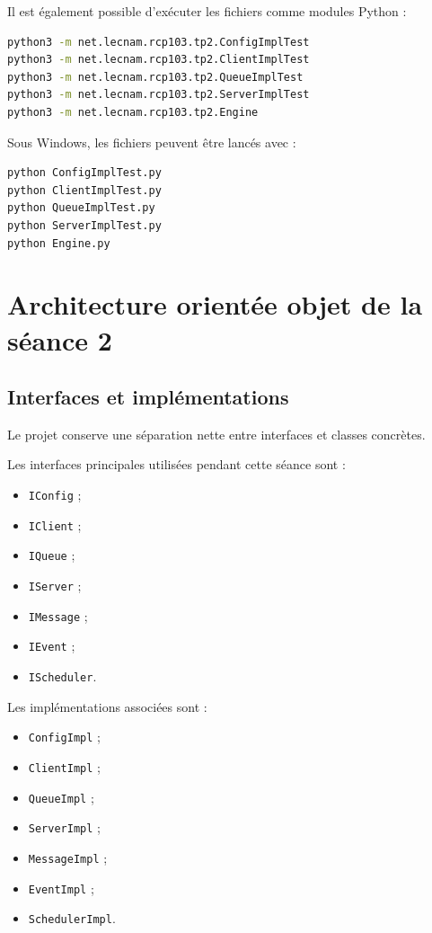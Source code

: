 \documentclass{article}
\begin{document}
Il est également possible d’exécuter les fichiers comme modules Python :

\begin{lstlisting}[language=bash, caption=Exécution sous forme de modules]
python3 -m net.lecnam.rcp103.tp2.ConfigImplTest
python3 -m net.lecnam.rcp103.tp2.ClientImplTest
python3 -m net.lecnam.rcp103.tp2.QueueImplTest
python3 -m net.lecnam.rcp103.tp2.ServerImplTest
python3 -m net.lecnam.rcp103.tp2.Engine
\end{lstlisting}

Sous Windows, les fichiers peuvent être lancés avec :

\begin{lstlisting}[language=bash, caption=Exécution sous Windows PowerShell]
python ConfigImplTest.py
python ClientImplTest.py
python QueueImplTest.py
python ServerImplTest.py
python Engine.py
\end{lstlisting}

\section{Architecture orientée objet de la séance 2}

\subsection{Interfaces et implémentations}

Le projet conserve une séparation nette entre interfaces et classes concrètes.

Les interfaces principales utilisées pendant cette séance sont :
\begin{itemize}[leftmargin=*]
    \item \texttt{IConfig} ;
    \item \texttt{IClient} ;
    \item \texttt{IQueue} ;
    \item \texttt{IServer} ;
    \item \texttt{IMessage} ;
    \item \texttt{IEvent} ;
    \item \texttt{IScheduler}.
\end{itemize}

Les implémentations associées sont :
\begin{itemize}[leftmargin=*]
    \item \texttt{ConfigImpl} ;
    \item \texttt{ClientImpl} ;
    \item \texttt{QueueImpl} ;
    \item \texttt{ServerImpl} ;
    \item \texttt{MessageImpl} ;
    \item \texttt{EventImpl} ;
    \item \texttt{SchedulerImpl}.
\end{itemize}
\end{document}
